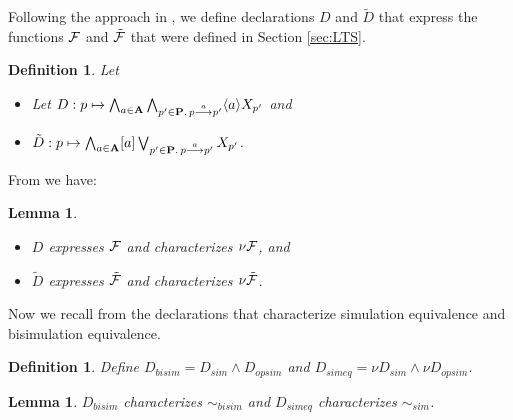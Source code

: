 \documentclass[submission]{eptcs}
\newcommand{\der}[1]{\ensuremath{\stackrel{#1}{\longrightarrow}}}
\newcommand{\Act}{{\bf A}}
\newcommand{\Proc}{{\bf P}}
\newcommand{\F}{{\cal F}}
\newcommand{\must}[1]{[ #1 ]}
\newcommand{\may}[1]{\langle #1 \rangle}
\newtheorem{lemma}[theorem]{Lemma}
\newtheorem{definition}[theorem]{Definition}
\begin{document}
Following the approach in \cite{AILS2011}, we define declarations $D$
and $\tilde{D}$ that express the functions $\F$ and $\tilde{\F}$ that
were defined in Section \ref{sec:LTS}. 
\begin{definition}Let
\begin{itemize}
\item Let $D: p\mapsto\bigwedge_{a \in \Act} \bigwedge_{p' \in
    \Proc.\, p \der{a} p'}\may{a}X_{p'} $ and 
\item $\tilde{D}:
  p\mapsto\bigwedge_{a\in \Act} \must{a}\bigvee_{p' \in \Proc.\, p
    \der{a} p'}X_{p'} $.
\end{itemize}
\end{definition}
\newpage
From \cite{AILS2011} we have:
\begin{lemma}\label{lemma:D-F}\quad
\begin{itemize}
\item
  $D$ expresses $\F$ and characterizes $\nu\F$,  and 
\item
$\tilde{D}$
  expresses $\tilde{\F}$ and characterizes $\nu\tilde{\F}$.
\end{itemize}
\end{lemma}
Now we recall from \cite{AILS2011} the declarations that characterize simulation
equivalence and bisimulation equivalence.
\begin{definition}
Define
$D_{bisim}=D_{sim}\land D_{opsim}$ and
$D_{simeq}=\nu D_{sim}\land \nu D_{opsim}$.
\end{definition}
\begin{lemma}\quad
 $D_{bisim}$ characterizes $\sim_{bisim}$ and $D_{simeq}$ characterizes $\sim_{sim}$. 
\iffalse
\begin{itemize}
\item $D_{bisim}$ characterizes the bisimulation equivalence $\sim_{bisim}$ and
\item $D_{simeq}$ characterizes the simulation equivalence
  $\sim_{sim}$.
\end{itemize}
\fi
\end{lemma}
\end{document}
